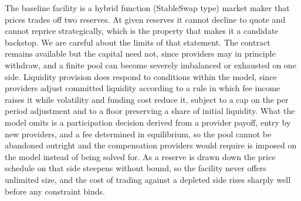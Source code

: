 \documentclass[a4paper,fleqn]{cas-sc}
\begin{document}
The baseline facility is a hybrid function (StableSwap type) market maker that prices trades off two reserves. At given reserves it cannot decline to quote and cannot reprice strategically, which is the property that makes it a candidate backstop. We are careful about the limits of that statement. The contract remains available but the capital need not, since providers may in principle withdraw, and a finite pool can become severely imbalanced or exhausted on one side. Liquidity provision does respond to conditions within the model, since providers adjust committed liquidity according to a rule in which fee income raises it while volatility and funding cost reduce it, subject to a cap on the per period adjustment and to a floor preserving a share of initial liquidity. What the model omits is a participation decision derived from a provider payoff, entry by new providers, and a fee determined in equilibrium, so the pool cannot be abandoned outright and the compensation providers would require is imposed on the model instead of being solved for. As a reserve is drawn down the price schedule on that side steepens without bound, so the facility never offers unlimited size, and the cost of trading against a depleted side rises sharply well before any constraint binds.
\end{document}
